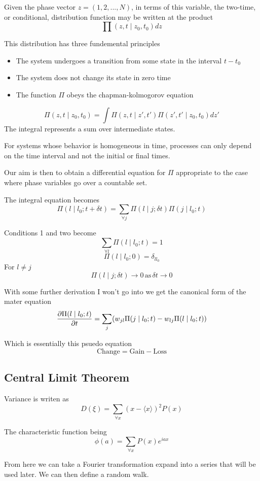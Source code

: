 Given the phase vector $z = (1,2,...,N)$, in terms of this variable, the two-time, or conditional, distribution function may be written at the product
\[
\prod (z,t \mid z_0, t_0) dz
  \]

  This distribution has three fundemental principles
\begin{itemize}
  \item The system undergoes a transition from some state in the interval $t-t_0$
  \item The system does not change its state in zero time
  \item The function $\Pi$ obeys the chapman-kolmogorov equation
\end{itemize}
\[
  \Pi (z,t \mid z_0, t_0) = \int  \Pi (z,t \mid z', t') \Pi (z',t' \mid z_0, t_0)dz'
\]
The integral represents a sum over intermediate states.

For systems whose behavior is homogeneous in time, processes can only depend on the time interval and not the initial or final times.

Our aim is then to obtain a differential equation for $\Pi$ appropriate to the case where phase variables go over a countable set.

The integral equation becomes
\[
\Pi( l \mid l_0 ; t+ \delta t ) = \sum_{\forall j} \Pi ( l \mid j ; \delta t ) \Pi ( j \mid l_0 ; t )
  \]

  Conditions 1 and two become
\[
\sum_{\forall l}\Pi (l \mid l_0; t) =1
  \]
\[
\Pi(l \mid l_0;0) = \delta_{ll_0}
  \]
  For $l \neq j$
\[
\Pi (l \mid j; \delta t) \to 0 \, \text{as} \, \delta t \to 0
  \]

  With some further derivation I won't go into we get the canonical form of the mater equation
\[
  \pdv{\Pi(l \mid l_0 ; t)}{t} = \sum_j (w_{jl} \Pi (j \mid l_0 ; t) - w_{lj} \Pi (l \mid l_0; t))
\]

Which is essentially this psuedo equation
$$\text{Change} = \text{Gain} - \text{Loss}$$

\subsection{Central Limit Theorem}

Variance is writen as
\[
D(\xi) = \sum_{\forall x}(x - \langle x \rangle)^2 P(x)
  \]

  The characteristic function being
\[
  \phi(a) = \sum_{\forall x} P(x)e^{iax}  \]

From here we can take a Fourier transformation expand into a series that will be used later. We can then define a random walk.

